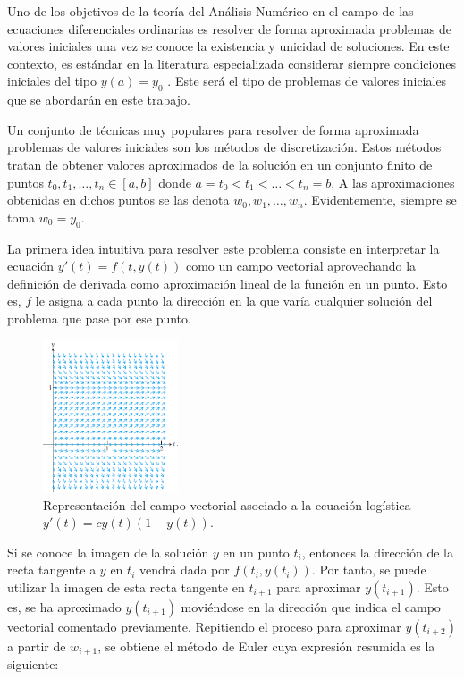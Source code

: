 \documentclass{article}
\theoremstyle{theorem-style}  %
\theoremstyle{definition-style}
\theoremstyle{example-style}
\begin{document}
	Uno de los objetivos de la teoría del Análisis Numérico en el campo de las ecuaciones diferenciales ordinarias es resolver de forma aproximada problemas de valores iniciales una vez se conoce la existencia y unicidad de soluciones. En este contexto, es estándar en la literatura especializada considerar siempre condiciones iniciales del tipo $y(a) = y_0$ \cite{sauer}. Este será el tipo de problemas de valores iniciales que se abordarán en este trabajo.
	
	Un conjunto de técnicas muy populares para resolver de forma aproximada problemas de valores iniciales son los métodos de discretización. Estos métodos tratan de obtener valores aproximados de la solución en un conjunto finito de puntos $t_0, t_1, \ldots, t_n \in [a,b]$ donde $a = t_0 < t_1 < \ldots < t_n = b$. A las aproximaciones obtenidas en dichos puntos se las denota $w_0, w_1, \ldots, w_n$. Evidentemente, siempre se toma $w_0 = y_0$.

	La primera idea intuitiva para resolver este problema consiste en interpretar la ecuación $y'(t) = f(t,y(t))$ como un campo vectorial aprovechando la definición de derivada como aproximación lineal de la función en un punto. Esto es, $f$ le asigna a cada punto la dirección en la que varía cualquier solución del problema que pase por ese punto.

	\begin{figure}[h]
		\centering
		\includegraphics[width=4cm]{./Images/interpret-pvi.png}
		\caption{Representación del campo vectorial asociado a la ecuación logística $y'(t) = c y(t) (1 - y(t))$.} 
		\label{fig:interpret-pvi}
	\end{figure}

	Si se conoce la imagen de la solución $y$ en un punto $t_{i}$, entonces la dirección de la recta tangente a $y$ en $t_{i}$ vendrá dada por $f(t_i,y(t_i))$. Por tanto, se puede utilizar la imagen de esta recta tangente en $t_{i+1}$ para aproximar $y(t_{i+1})$. Esto es, se ha aproximado $y(t_{i+1})$ moviéndose en la dirección que indica el campo vectorial comentado previamente. Repitiendo el proceso para aproximar $y(t_{i+2})$ a partir de $w_{i+1}$, se obtiene el método de Euler cuya expresión resumida es la siguiente:
\end{document}
